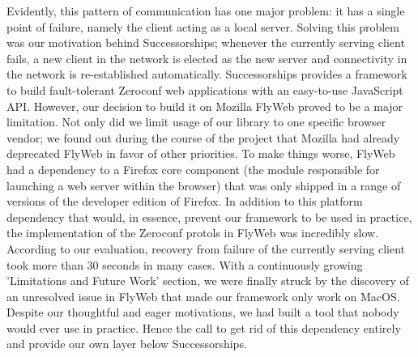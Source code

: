 Evidently, this pattern of communication has one major problem: it has a single point of failure, namely the client acting as a local server. 
Solving this problem was our motivation behind Successorships; whenever the currently serving client fails, a new client in the network is elected as the new server and connectivity in the network is re-established automatically.
Successorships provides a framework to build fault-tolerant Zeroconf web applications with an easy-to-use JavaScript API.
However, our decision to build it on Mozilla FlyWeb proved to be a major limitation.
Not only did we limit usage of our library to one specific browser vendor; we found out during the course of the project that Mozilla had already deprecated FlyWeb in favor of other priorities.
To make things worse, FlyWeb had a dependency to a Firefox core component (the module responsible for launching a web server within the browser) that was only shipped in a range of versions of the developer edition of Firefox.
In addition to this platform dependency that would, in essence, prevent our framework to be used in practice, the implementation of the Zeroconf protols in FlyWeb was incredibly slow.
According to our evaluation, recovery from failure of the currently serving client took more than 30 seconds in many cases.
With a continuously growing 'Limitations and Future Work' section, we were finally struck by the discovery of an unresolved issue in FlyWeb that made our framework only work on MacOS.
Despite our thoughtful and eager motivations, we had built a tool that nobody would ever use in practice.
Hence the call to get rid of this dependency entirely and provide our own layer below  Successorships.
